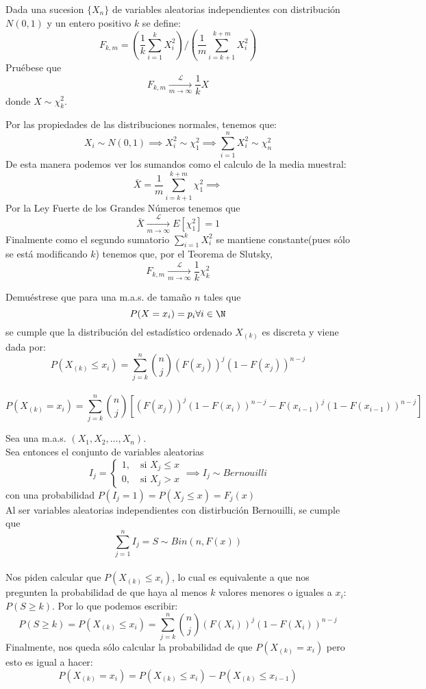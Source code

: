 \begin{problem}{2.4}
	Dada una sucesion $\{X_n\}$ de variables aleatorias independientes con distribución $N(0,1)$ y un entero positivo $k$ se define: 
	$$F_{k,m} = \left(\frac{1}{k}\sum_{i = 1}^k X_i^2 \right) / \left(\frac{1}{m}\sum_{i = k+1}^{k+m}X_i^2\right)$$
	Pruébese que
	\[
	F_{k,m} \xrightarrow[m \to \infty]{\mathcal{L}} \frac{1}{k} X
	\]
	donde \( X \sim \chi^2_k \). 
\end{problem}
\begin{sol}
	Por las propiedades de las distribuciones normales, tenemos que: $$X_i \sim N(0,1) \implies X_i^2 \sim \chi^2_1 \implies \sum_{i = 1}^{n} X_i^2 \sim \chi_n^2$$
	De esta manera podemos ver los sumandos como el calculo de la media muestral: $$\bar{X} = \frac{1}{m} \sum_{i = k+1}^{k+m} \chi^2_1 \implies $$ Por la Ley Fuerte de los Grandes Números tenemos que $$\bar{X} \xrightarrow[m \to \infty]{\mathcal{L}} E[\chi^2_1] = 1$$ 
	Finalmente como el segundo sumatorio $\sum_{i = 1}^{k} X_i^2$ se mantiene constante(pues sólo se está modificando $k$) tenemos que, por el Teorema de Slutsky, $$F_{k,m} \xrightarrow[m \to \infty]{\mathcal{L}} \frac{1}{k} \chi_k^2$$
\end{sol}
\begin{problem}{2.5}
	Demuéstrese que para una m.a.s. de tamaño $n$ tales que $$P(X = x_i) = p_i \forall i \in \N$$ se cumple que la distribución del estadístico ordenado $X_{(k)}$ es discreta y viene dada por: 
	$$P(X_{(k)} \leq x_i) = \sum_{j = k}^{n} \binom{n}{j} (F(x_j))^j(1-F(x_j))^{n-j}$$ 
	\\
	$$P(X_{(k)} = x_i) = \sum_{j = k}^{n} \binom{n}{j}[(F(x_j))^j(1 - F(x_i))^{n-j} - F(x_{i-1})^j(1 - F(x_{i-1}))^{n-j}]$$	
\end{problem}
\begin{sol}
	Sea una m.a.s. $\left(X_1, X_2, \ldots, X_n\right)$. \\Sea entonces el conjunto de variables aleatorias $$I_j = \begin{cases} 1, \quad \text{si } X_j \leq x \\ 0, \quad \text{si } X_j > x \end{cases} \implies I_j \sim Bernouilli$$ con una probabilidad $P(I_j = 1) = P(X_j \leq x) = F_j(x)$\\ Al ser variables aleatorias independientes con distirbución Bernouilli, se cumple que $$\sum_{j = 1}^{n} I_j = S \sim Bin(n, F(x))$$\\
	Nos piden calcular que $P(X_{(k)} \leq x_i)$, lo cual es equivalente a que nos pregunten la probabilidad de que haya al menos $k$ valores menores o iguales a $x_i$: $P(S \geq k)$. Por lo que podemos escribir: 
	$$P(S \geq k) = P(X_{(k)} \leq x_i) = \sum_{j = k}^{n} \binom{n}{j}(F(X_i))^j(1 - F(X_i))^{n-j}$$
	Finalmente, nos queda sólo calcular la probabilidad de que $P(X_{(k)} = x_i)$ pero esto es igual a hacer: 
	$$P(X_{(k)} = x_i) = P(X_{(k)} \leq x_i) - P(X_{(k)} \leq x_{i-1})$$
\end{sol}